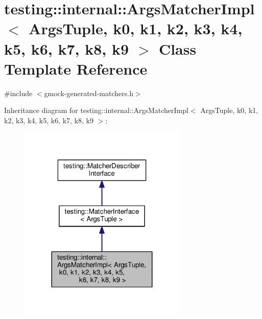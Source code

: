 \hypertarget{classtesting_1_1internal_1_1ArgsMatcherImpl}{}\section{testing\+:\+:internal\+:\+:Args\+Matcher\+Impl$<$ Args\+Tuple, k0, k1, k2, k3, k4, k5, k6, k7, k8, k9 $>$ Class Template Reference}
\label{classtesting_1_1internal_1_1ArgsMatcherImpl}


{\ttfamily \#include $<$gmock-\/generated-\/matchers.\+h$>$}



Inheritance diagram for testing\+:\+:internal\+:\+:Args\+Matcher\+Impl$<$ Args\+Tuple, k0, k1, k2, k3, k4, k5, k6, k7, k8, k9 $>$\+:\nopagebreak
\begin{figure}[H]
\begin{center}
\leavevmode
\includegraphics[width=227pt]{classtesting_1_1internal_1_1ArgsMatcherImpl__inherit__graph}
\end{center}
\end{figure}


